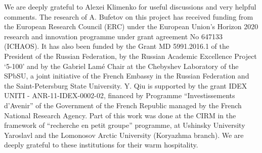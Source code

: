 \documentclass[12pt]{paper}
\numberwithin{theorem}{section}
\numberwithin{figure}{section}
\numberwithin{equation}{section}
\begin{document}
We are deeply grateful to Alexei Klimenko for useful discussions and very helpful comments.
The research of A. Bufetov on this project has received funding from the European Research Council (ERC) under the European Union's Horizon 2020 research and innovation programme under grant agreement No 647133 (ICHAOS). It has also been funded by the Grant MD 5991.2016.1 of the President of the Russian Federation, by  the Russian Academic Excellence Project `5-100' and by the Gabriel Lam\'e Chair  at the Chebyshev Laboratory of the SPbSU, a joint initiative of the French Embassy in the Russian Federation and the Saint-Petersburg State University.
 Y. Qiu is supported by the grant IDEX UNITI - ANR-11-IDEX-0002-02, financed by Programme ``Investissements d'Avenir'' of the Government of the French Republic managed by the French National Research Agency.
Part of this work was done at the CIRM in the framework of ``recherche en petit groupe'' programme, at Ushinsky University Yaroslavl  and the  Lomonosov Arctic University (Koryazhma branch). We are deeply grateful to these institutions for their  warm hospitality.

































%
%
%
%
\end{document}
